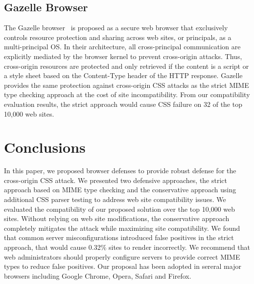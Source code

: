 \documentclass{acm_proc_article-sp}
\begin{document}
\subsection{Gazelle Browser}
The Gazelle browser~\cite{gazelle} is proposed as a secure web browser that exclusively controls resource protection and sharing across web sites, or principals, as a multi-principal OS. In their architecture, all cross-principal communication are explicitly mediated by the browser kernel to prevent cross-origin attacks. Thus, cross-origin resources are protected and only retrieved if the content is a script or a style sheet based on the Content-Type header of the HTTP response. Gazelle provides the same protection against cross-origin CSS attacks as the strict MIME type checking approach at the cost of site incompatibility. From our compatibility evaluation results, the strict approach would cause CSS failure on 32 of the top 10,000 web sites.

\section{Conclusions} \label{sec:conclusion}
In this paper, we proposed browser defenses to provide robust defense for the cross-origin CSS attack. We presented two defensive approaches, the strict approach based on MIME type checking and the conservative approach using additional CSS parser testing to address web site compatibility issues. We evaluated the compatibility of our proposed solution over the top 10,000 web sites. Without relying on web site modifications, the conservative approach completely mitigates the attack while maximizing site compatibility. We found that common server misconfigurations introduced false positives in the strict approach, that would cause 0.32\% sites to render incorrectly. We recommend that web administrators should properly configure servers to provide correct MIME types to reduce false positives. Our proposal has been adopted in sereral major browsers including Google Chrome, Opera, Safari and Firefox.



\end{document}
